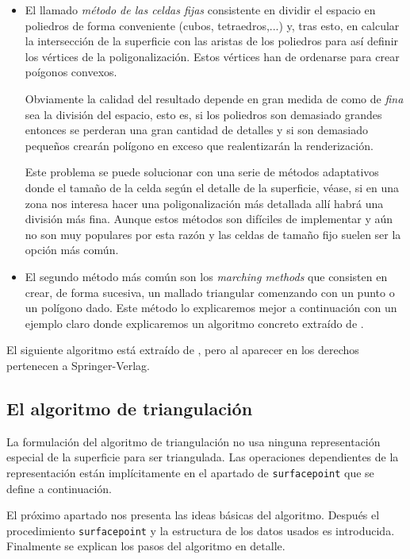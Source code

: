 \begin{itemize}
	\item El llamado{ \em método de las celdas fijas}\cite{Bloomenthal90} consistente en dividir el espacio en poliedros de forma conveniente (cubos, tetraedros,...) y, tras esto, en calcular la intersección de la superficie con  las aristas de los poliedros para así definir los vértices de la poligonalización. Estos vértices han de ordenarse para crear poígonos convexos.
	\par Obviamente la calidad del resultado depende en gran medida de como de { \em fina} sea la división del espacio, esto es, si los poliedros son demasiado grandes entonces se perderan una gran cantidad de detalles y si son demasiado pequeños crearán polígono en exceso que realentizarán la renderización.
	\par Este problema se puede solucionar con una serie de métodos adaptativos donde el tamaño de la celda según el detalle de la superficie, véase, si en una zona nos interesa hacer una poligonalización más detallada allí habrá una división más fina. Aunque estos métodos son difíciles de implementar y aún no son muy populares por esta razón y las celdas de tamaño fijo suelen ser la opción más común.
	\item El segundo método más común son los{ \em marching methods} que consisten en crear, de forma sucesiva, un mallado triangular comenzando con un punto o un polígono dado. Este método lo explicaremos mejor a continuación con un ejemplo claro donde explicaremos un algoritmo concreto extraído de \cite{Hartmann03}.
\end{itemize}

\begin{remark}
	El siguiente algoritmo está extraído de \cite{Hartmann03}, pero al aparecer en \cite{Hartmann98} los derechos pertenecen a Springer-Verlag.
\end{remark}

\subsection{El algoritmo de triangulación}

La formulación del algoritmo de triangulación no usa ninguna representación especial de la superficie para ser triangulada. Las operaciones dependientes de la representación están implícitamente en el apartado de \texttt{surfacepoint} que se define a continuación.
\par El próximo apartado nos presenta las ideas básicas del algoritmo. Después el procedimiento \texttt{surfacepoint} y la estructura de los datos usados es introducida. Finalmente se explican los pasos del algoritmo en detalle.

